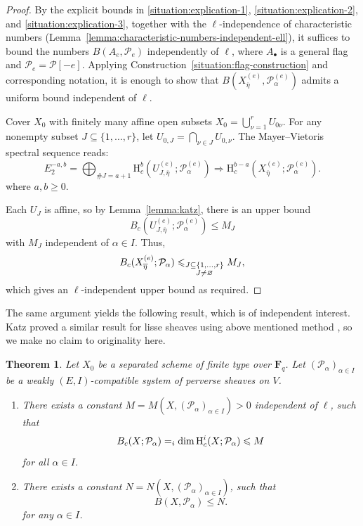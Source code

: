 \documentclass[english]{smfart}
\let\sum\relax\DeclareMathSymbol{\sum}{\mathop}{fourier}{80}
\renewcommand{\mathbb}{\mathbf}
\renewcommand{\emptyset}{\varnothing}
\renewcommand{\leq}{\leqslant}
\renewcommand{\geq}{\geqslant}
\renewcommand{\subset}{\subseteq}
\theoremstyle{remark}
\theoremstyle{plain}
\newtheorem{theorem}[remark]{Theorem}
\theoremstyle{definition}
\numberwithin{equation}{remark}
\theoremstyle{void}
\begin{document}
\begin{proof}
By the explicit bounds in \ref{situation:explication-1},
\ref{situation:explication-2}, and \ref{situation:explication-3},
together with the \(\ell\)-independence of characteristic numbers
(Lemma~\ref{lemma:characteristic-numbers-independent-ell}), it
suffices to bound the numbers \(B(A_{e}, \mathcal{P}_{e})\)
independently of \(\ell\), where \(A_{\bullet}\) is a general flag and
\(\mathcal{P}_{e} = \mathcal{P}[-e]\).  Applying
Construction~\ref{situation:flag-construction} and corresponding
notation, it is enough to show that
\(B(X^{(e)}_{\overline{\eta}}, \mathcal{P}^{(e)}_{\alpha})\) admits a
uniform bound independent of \(\ell\).

Cover \(X_0\) with finitely many affine open subsets
\(X_0 = \bigcup_{\nu=1}^r U_{0\nu}\).  For any nonempty subset
\(J \subset \{1,\ldots,r\}\), let
\(U_{0,J} = \bigcap_{\nu\in J} U_{0,\nu}\).  The Mayer--Vietoris
spectral sequence reads:
\[
E_2^{-a,b} = \bigoplus_{\#J = a+1} \mathrm{H}_c^b(U^{(e)}_{J, \overline{\eta}}; \mathcal{P}^{(e)}_\alpha)
\Longrightarrow \mathrm{H}_c^{b-a}(X^{(e)}_{\overline{\eta}}; \mathcal{P}^{(e)}_\alpha).
\]
where \(a,b\geq 0\).

Each \(U_J\) is affine, so by Lemma~\ref{lemma:katz}, there is an
upper bound
\[
B_c(U^{(e)}_{J, \overline{\eta}}; \mathcal{P}^{(e)}_\alpha) \leq M_J
\]
with \(M_J\) independent of \(\alpha\in I\).  Thus,
\[
B_c(X^{(e)}_{\overline{\eta}}; \mathcal{P}_\alpha) \leq \sum_{\substack{J \subset \{1,\ldots,r\} \\ J \neq \emptyset}} M_J,
\]
which gives an \(\ell\)-independent upper bound as required.
\end{proof}

The same argument yields the following result,
which is of independent interest.
Katz proved a similar result for lisse sheaves using above mentioned method
\cite{katz_betti}, so we make no claim to originality here.

\begin{theorem}\label{theorem:katz}
Let \(X_0\) be a separated scheme of finite type over
\(\mathbb{F}_{q}\).  Let \((\mathcal{P}_{\alpha})_{\alpha\in I}\) be a
weakly \((E,I)\)-compatible system of perverse sheaves on \(V\).
\begin{enumerate}
\item There exists a constant
\(M = M(X,(\mathcal{P}_{\alpha})_{\alpha\in I}) > 0\) independent of
\(\ell\), such that
\[
B_{c}(X;\mathcal{P}_{\alpha}) = \sum_{i} \dim
\mathrm{H}_{c}^{i}(X; \mathcal{P}_{\alpha}) \leq M
\]
for all \(\alpha \in I\).
\item There exists a constant
\(N = N(X,(\mathcal{P}_{\alpha})_{\alpha\in I})\), such that
\[
B(X,\mathcal{P}_{\alpha}) \leq N.
\]
for any \(\alpha\in I\).
\end{enumerate}
\end{theorem}
\end{document}
